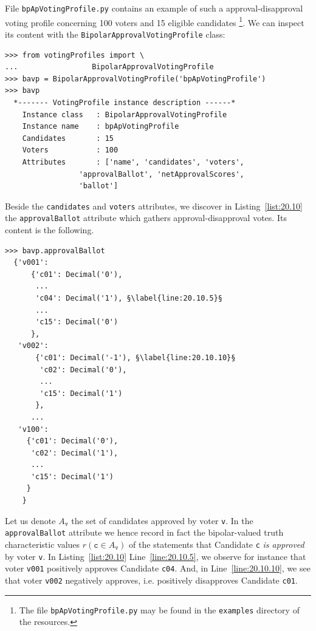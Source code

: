 File \texttt{bpApVotingProfile.py} contains an example of such a approval-disapproval voting profile concerning 100 voters and 15 eligible candidates \footnote{The file \texttt{bpApVotingProfile.py} may be found in the \texttt{examples} directory of the \Digraph resources.}. We can inspect its content with the \texttt{BipolarApprovalVotingProfile} class:
\begin{lstlisting}[caption={Bipolar approval voting profiles},label=list:20.9]
>>> from votingProfiles import \
...                 BipolarApprovalVotingProfile
>>> bavp = BipolarApprovalVotingProfile('bpApVotingProfile')
>>> bavp
  *------- VotingProfile instance description ------*
    Instance class   : BipolarApprovalVotingProfile
    Instance name    : bpApVotingProfile
    Candidates       : 15
    Voters           : 100
    Attributes       : ['name', 'candidates', 'voters',
                 'approvalBallot', 'netApprovalScores',
                 'ballot']
\end{lstlisting}

Beside the \texttt{candidates} and \texttt{voters} attributes, we discover in Listing~\vref{list:20.10} the \texttt{approvalBallot} attribute which gathers approval-disapproval votes. Its content is the following.
\begin{lstlisting}[caption={Inspecting an approval-disapproval ballot},label=list:20.10]
>>> bavp.approvalBallot
  {'v001':
      {'c01': Decimal('0'),
       ...
       'c04': Decimal('1'), §\label{line:20.10.5}§
       ...
       'c15': Decimal('0')
      },
   'v002':
       {'c01': Decimal('-1'), §\label{line:20.10.10}§
        'c02': Decimal('0'),
        ...
        'c15': Decimal('1')
       },
      ...
   'v100':
     {'c01': Decimal('0'),
      'c02': Decimal('1'),
      ...
      'c15': Decimal('1')
     }
    }
\end{lstlisting}	

Let us denote $A_{\mathtt{v}}$ the set of candidates approved by voter \texttt{v}. In the \texttt{approval\-Ballot} attribute we hence record in fact the bipolar-valued truth characteristic values $r(\mathtt{c} \in A_{\mathtt{v}})$ of the statements that Candidate \texttt{c} \emph{is approved} by voter \texttt{v}. In Listing~\vref{list:20.10} Line~\ref{line:20.10.5}, we observe for instance that voter \texttt{v001} positively approves Candidate \texttt{c04}. And, in Line~\ref{line:20.10.10}, we see that voter \texttt{v002} negatively approves, i.e. positively disapproves Candidate \texttt{c01}.

